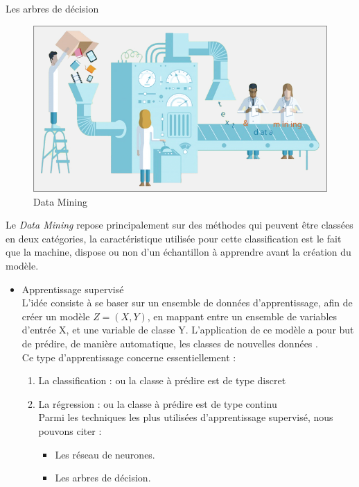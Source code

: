 \documentclass[a4paper, 11pt]{report}
\begin{document}
\begin{chapter}{Les arbres de décision}
\begin{figure}[!h]
\begin{center}
	\includegraphics[scale=0.6]{Images/DataMining2.png}
	\caption{Data Mining}
\end{center}
\end{figure}

Le \emph{Data Mining} repose principalement sur des méthodes qui peuvent être classées en deux catégories, la caractéristique utilisée pour cette classification est le fait que la machine, dispose ou non d'un échantillon à apprendre avant la création du modèle.\\

\begin{itemize}
\item Apprentissage supervisé\\
L'idée consiste à se baser sur un ensemble de données d'apprentissage, afin de créer un modèle $Z = (X,Y)$,  en mappant entre un ensemble de variables d'entrée X, et une variable de classe Y. L'application de ce modèle a pour but de prédire, de manière automatique, les classes de nouvelles données \cite{wolpert2002supervised}.\\


Ce type d'apprentissage concerne essentiellement :
\begin{enumerate}
\item La classification : ou la classe à prédire est de type discret
\item La régression : ou la classe à prédire est de type continu
\\Parmi les techniques les plus utilisées d'apprentissage supervisé, nous pouvons citer : 
\begin{itemize}
\item Les réseau de neurones.
\item Les arbres de décision.


\end{itemize}
\end{enumerate}
\end{itemize}
\end{chapter}
\end{document}
